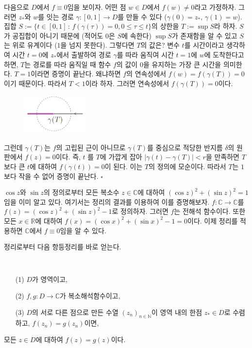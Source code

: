 다음으로 $D$에서 $f\equiv 0$임을 보이자.
어떤 점 $w\in D$에서 $f(w)\ne0$라고 가정하자.
그러면 $z_*$와 $w$를 잇는 경로 $\gamma :[0,1] \to D$를 만들 수 있다
($\gamma(0)=z_*$, $\gamma(1)=w$).
집합 $S:=\{t\in[0,1]\,:\, f(\gamma(\tau))=0, 0\le \tau \le t \}$의
상한을 $T:=\sup S$라 하자. $S$가 공집합이 아니기 때문에 (적어도 $0$은 $S$에 속한다)
$\sup S$가 존재함을 알 수 있고
$S$는 위로 유계이다 ($1$을 넘지 못한다). 
그렇다면 $T$의 값은? 변수 $t$를 시간이라고 생각하여
시간 $t=0$에 $z_*$에서 출발하여 경로 $\gamma$를 따라 움직여
시간 $t=1$에 $w$에 도착한다고 하면,
$T$는 경로를 따라 움직일 때 함수 $f$의 값이 $0$을 유지하는 가장 큰 시간을 의미한다.
$T=1$이라면 증명이 끝난다. 왜냐하면 $f$의 연속성에서 $f(w)=f(\gamma(T))=0$이기 때문이다.
따라서 $T<1$이라 하자.
그러면 연속성에서 $f(\gamma(T))=0$이다. 
\begin{figure}[h!]
\begin{center}
\includegraphics[width=0.3\textwidth]{./SaltChapter/fig-4-0-6}
\end{center}
\end{figure}

그런데 $\gamma(T)$는 $f$의 고립된 근이 아니므로
$\gamma(T)$를 중심으로 적당한 반지름 $\delta$의 원판에서
 $f(z)=0$이다. 즉, 
 $t$ 를 $T$에 가깝게 잡아 $|\gamma(t) - \gamma(T)|<r$을 만족하면
 $T$보다 큰 $t$에 대하여 $f(\gamma(t))=0$이 된다.
이는 $T$의 정의에 모순이다. 따라서 $T$는 $1$보다 작을 수 없어 증명이 끝난다.
\hfill $\square$

\begin{saltexample}[label=example-4-7]{}{}
$\cos z$와 $\sin z$의 정의로부터 모든 복소수 $z\in \mathbb C$에 대하여
$(\cos z)^2 + (\sin z)^2 = 1$임을 이미 알고 있다.
여기서는 정리의 결과를 이용하여 이를 증명해보자.
$f:\mathbb C \to \mathbb C$를 $f(z) = (\cos z)^2 + (\sin z)^2 - 1$로
정의하자. 그러면 $f$는 전해석 함수이다. 또한
모든 $x\in \mathbb R$에 대하여 $ f(x) = (\cos x)^2 + (\sin x)^2 - 1 = 0$이다.
이제 정리를 적용하면 $\mathbb C$에서 $f\equiv 0$임을 알 수 있다.
\end{saltexample}

정리로부터 다음 항등정리를 바로 얻는다.

\begin{salt_corollary}  \label{coro-4-6}
\
\begin{itemize}
\item[(1)] $D$가 영역이고,
\item[(2)] $f,g:D\to\mathbb C$가 복소해석함수이고,
\item[(3)] $D$의 서로 다른 점으로 만든 수열 $(z_n)_{n\in\mathbb N}$이 
영역 내의 한점 $z_*\in D$로 수렴하고,
$f(z_n) = g(z_n)$이면,
\end{itemize}
모든 $z\in D$에 대하여 $f(z) = g(z)$이다.
\end{salt_corollary}

